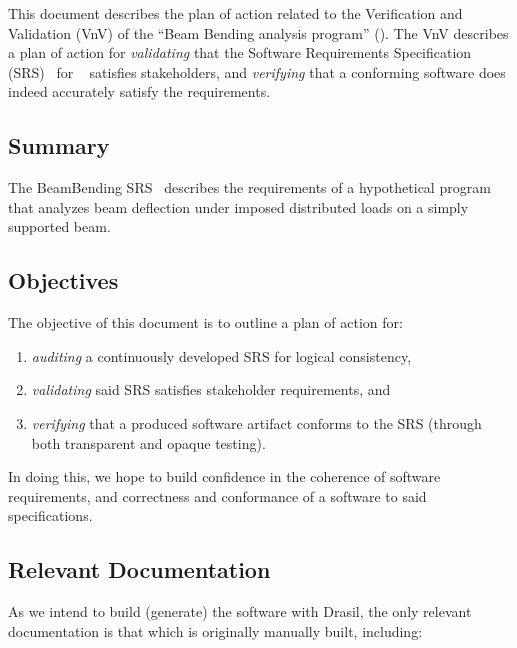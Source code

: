 \documentclass[12pt, titlepage]{article}
\begin{document}
This document describes the plan of action related to the Verification and
Validation (VnV) of the ``Beam Bending analysis program'' (\progname{}). The VnV
describes a plan of action for \textit{validating} that the Software
Requirements Specification (SRS)~\cite{SmithAndLai2005} for
\progname{}~\cite{BalaciBeamBendingSRS2023} satisfies stakeholders, and
\textit{verifying} that a conforming software does indeed accurately satisfy the
requirements.

\subsection{Summary}

The BeamBending SRS~\cite{BalaciBeamBendingSRS2023} describes the requirements
of a hypothetical program that analyzes beam deflection under imposed
distributed loads on a simply supported beam.

\subsection{Objectives}

The objective of this document is to outline a plan of action for:

\begin{enumerate}

    \item \textit{auditing} a continuously developed SRS
          \cite{ParnasAndClements1986} for logical consistency,

    \item \textit{validating} said SRS satisfies stakeholder requirements, and

    \item \textit{verifying} that a produced software artifact conforms to the
          SRS (through both transparent and opaque testing).

\end{enumerate}

In doing this, we hope to build confidence in the coherence of software
requirements, and correctness and conformance of a software to said
specifications.

\subsection{Relevant Documentation}

As we intend to build (generate) the software with Drasil, the only relevant
documentation is that which is originally manually built, including:
\end{document}
